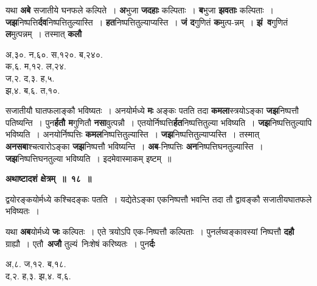\documentclass[11pt, openany]{book}
\begin{document}
\begin{flushleft}
\begin{minipage}[t]{0.55\textwidth}
\hspace{4mm} यथा \textbf{अबे} सजातीये घनफले कल्पिते~। \textbf{अ}भुजा \textbf{जदहाः} कल्पिताः~। \textbf{ब}भुजा \textbf{झवताः} कल्पिताः~। \textbf{जझ}निष्पत्ति\textbf{र्दव}निष्पत्तितुल्यास्ति~। \textbf{हत}निष्पत्तितुल्याप्यस्ति~। \textbf{जं द}गुणितं \textbf{क}मुत्प-न्नम्~। \textbf{झं \,व}गुणितं \,\textbf{ल}मुत्पन्नम्~। तस्मात् \textbf{कलौ}
\end{minipage} 
\hfill
\begin{minipage}[t]{0.35\textwidth}
अ,३०. न,६०. स,१२०. ब,२४०.\\
क,६. म,१२. ल,२४.\\
ज,२. द,३. ह,५.\\
झ,४. ब,६. त,१०.
\end{minipage}
\end{flushleft}
\vspace{-3mm}

\noindent सजातीयौ घातफलाङ्कौ भविष्यतः~। अनयोर्मध्ये \textbf{मः} अङ्कः पतति तदा \textbf{कमला}स्त्रयोऽङ्का \textbf{जझ}निष्पत्तौ पतिष्यन्ति~। पुन\textbf{र्हतौ म}गुणितौ \textbf{नसा}वुत्पन्नौ~। एतयोर्निष्पत्ति\textbf{र्हत}निष्पत्तितुल्या भविष्यति~। \textbf{जझ}निष्पत्तितुल्यापि भविष्यति~। अनयोर्निष्पत्तिः \textbf{कमल}निष्पत्तितुल्यास्ति~। \textbf{जझ}निष्पत्तितुल्याप्यस्ति~। तस्मात् \textbf{अनसबा}श्चत्वारोऽङ्का \textbf{जझ}निष्पत्तौ भविष्यन्ति~। \textbf{अब}-निष्पत्तिः \textbf{अन}निष्पत्तिघनतुल्यास्ति~। \textbf{जझ}निष्पत्तिघनतुल्या भविष्यति~। इदमेवास्माकम् इष्टम्~॥ 
\vspace{2mm}

\begin{center}
\textbf{\large अथाष्टादशं क्षेत्रम्~॥~१८~॥}
\end{center}

{\ab द्वयोरङ्कयोर्मध्ये कश्चिदङ्कः पतति~। यद्येतेऽङ्का एकनिष्पत्तौ भवन्ति तदा तौ द्वावङ्कौ सजातीयघातफले भविष्यतः~।} 

\newpage
\begin{flushleft}
\begin{minipage}[t]{0.62\textwidth}
\hspace{4mm} यथा \textbf{अब}योर्मध्ये \textbf{जः} कल्पितः~। एते त्रयोऽपि एक-निष्पत्तौ कल्पिताः~। पुनर्लघ्वङ्कावस्यां निष्पत्तौ \textbf{दहौ} ग्राह्यौ~। एतौ \,\textbf{अजौ} तुल्यं \,निःशेषं करिष्यतः~। पुन\textbf{र्दः}
\end{minipage} 
\hfill
\begin{minipage}[t]{0.28\textwidth}
अ,८. ज,१२. ब,१८. \\
द,२. ह,३. झ,४. व,६.
\end{minipage}
\end{flushleft}
\vspace{-3mm}
\end{document}

